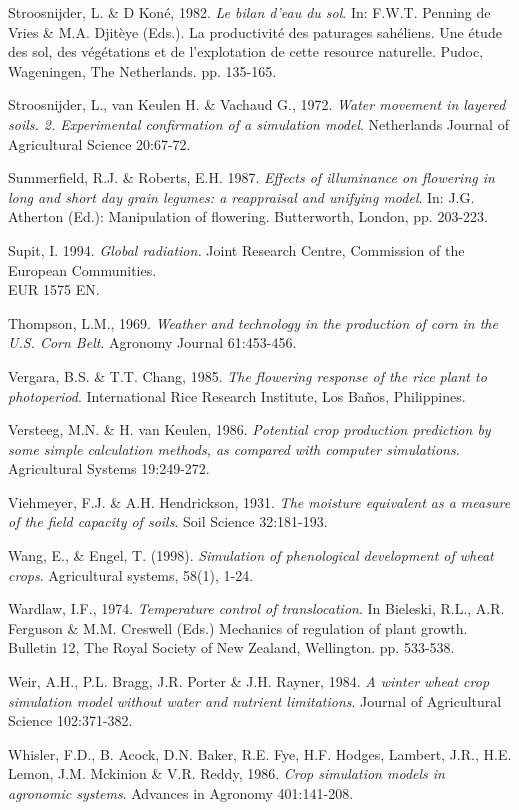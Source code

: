 Stroosnijder, L. \& D Kon\'{e}, 1982. {\it Le bilan d'eau du sol\/}. In: F.W.T. Penning de Vries \& M.A.
Djit\`{e}ye (Eds.). La productivit\'{e} des paturages sah\'{e}liens. Une \'{e}tude des sol, des v\'{e}g\'{e}tations et de
l'explotation de cette resource naturelle. Pudoc, Wageningen, The Netherlands. pp. 135-165.

Stroosnijder, L., van Keulen H. \& Vachaud G., 1972. {\it Water movement in layered soils. 2.
Experimental confirmation of a simulation model\/}. Netherlands Journal of Agricultural Science 20:67-72.

Summerfield, R.J. \& Roberts, E.H. 1987. {\it Effects of illuminance on flowering in long and short day
grain legumes: a reappraisal and unifying model\/}. In: J.G. Atherton (Ed.): Manipulation of flowering.
Butterworth, London, pp. 203-223.

Supit, I. 1994. {\it Global radiation. \/}Joint Research Centre, Commission of the European Communities.\\
EUR 1575 EN.

Thompson, L.M., 1969. {\it Weather and technology in the production of corn in the U.S. Corn Belt\/}.
Agronomy Journal 61:453-456.

Vergara, B.S. \& T.T. Chang, 1985. {\it The flowering response of the rice plant to photoperiod\/}.
International Rice Research Institute, Los Ba\~{n}os, Philippines.

Versteeg, M.N. \& H. van Keulen, 1986. {\it Potential crop production prediction by some simple
calculation methods, as compared with computer simulations\/}. Agricultural Systems 19:249-272.

Viehmeyer, F.J. \& A.H. Hendrickson, 1931. {\it The moisture equivalent as a measure of the field
capacity of soils\/}. Soil Science 32:181-193.

Wang, E., \& Engel, T. (1998). {\it Simulation of phenological development of wheat crops}. Agricultural systems, 58(1), 1-24.

Wardlaw, I.F., 1974. {\it Temperature control of translocation\/}. In Bieleski, R.L., A.R. Ferguson \&
M.M. Creswell (Eds.) Mechanics of regulation of plant growth. Bulletin 12, The Royal Society of
New Zealand, Wellington. pp. 533-538.

Weir, A.H., P.L. Bragg, J.R. Porter \& J.H. Rayner, 1984. {\it A winter wheat crop simulation model
without water and nutrient limitations\/}. Journal of Agricultural Science 102:371-382.

Whisler, F.D., B. Acock, D.N. Baker, R.E. Fye, H.F. Hodges, Lambert, J.R., H.E. Lemon, J.M.
Mckinion \& V.R. Reddy, 1986. {\it Crop simulation models in agronomic systems\/}. Advances in
Agronomy 401:141-208.

